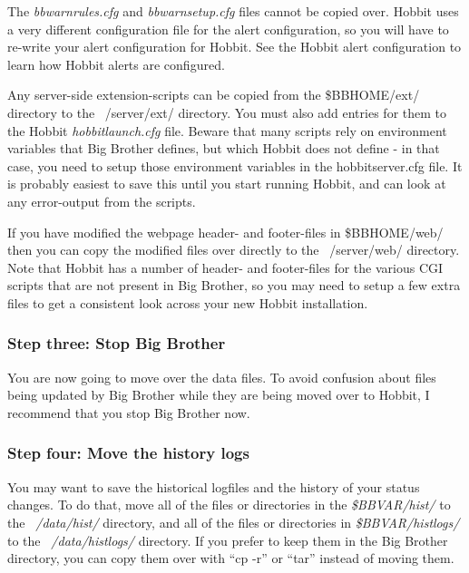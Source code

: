  The \emph{bbwarnrules.cfg}
 and \emph{bbwarnsetup.cfg} files cannot be copied over. Hobbit uses a
 very different configuration file for the alert configuration, so you
 will have to re-write your alert configuration for Hobbit. See the
 Hobbit alert configuration to learn how Hobbit alerts are configured.


 Any server-side extension-scripts can be copied from the
 \$BBHOME/ext/ directory to the ~/server/ext/ directory. You must also
 add entries for them to the Hobbit \emph{hobbitlaunch.cfg}
 file. Beware that many scripts rely on environment variables that Big
 Brother defines, but which Hobbit does not define - in that case, you
 need to setup those environment variables in the hobbitserver.cfg
 file. It is probably easiest to save this until you start running
 Hobbit, and can look at any error-output from the scripts.



 If you have modified the webpage header- and footer-files in
 \$BBHOME/web/ then you can copy the modified files over directly to
 the ~/server/web/ directory. Note that Hobbit has a number of header-
 and footer-files for the various CGI scripts that are not present in
 Big Brother, so you may need to setup a few extra files to get a
 consistent look across your new Hobbit installation.


\subsubsection{Step three: Stop Big Brother}


 You are now going to move over the data files. To avoid confusion
 about files being updated by Big Brother while they are being moved
 over to Hobbit, I recommend that you stop Big Brother now.

\subsubsection{Step four: Move the history logs}


 You may want to save the historical logfiles and the history of your
 status changes. To do that, move all of the files or directories in
 the \emph{\$BBVAR/hist/} to the \emph{~/data/hist/} directory, and
 all of the files or directories in \emph{\$BBVAR/histlogs/} to the
 \emph{~/data/histlogs/}  directory. If you prefer to keep them in the
 Big Brother directory, you can copy them over with ``cp -r'' or
 ``tar'' instead of moving them.

